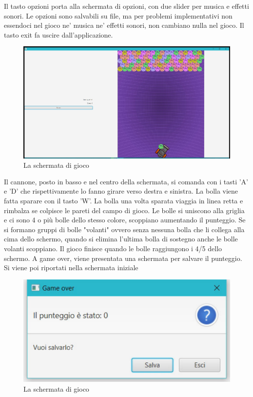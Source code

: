 \documentclass[a4paper,12pt]{report}
\begin{document}
Il tasto opzioni porta alla schermata di opzioni, con due slider per musica e effetti sonori. Le opzioni sono salvabili su file, 
ma per problemi implementativi non essendoci nel gioco ne' musica ne' effetti sonori, non cambiano nulla nel gioco.
Il tasto exit fa uscire dall'applicazione.
\begin{figure}[H]
	\centering{}
	\includegraphics[width=\textwidth]{img/game_1.pdf}
	\caption{La schermata di gioco}
\end{figure}
Il cannone, posto in basso e nel centro della schermata, si comanda con i tasti 'A' e 'D' che rispettivamente lo fanno girare verso destra e sinistra.
La bolla viene fatta sparare con il tasto 'W'. La bolla una volta sparata viaggia in linea retta e rimbalza se colpisce le pareti del campo di gioco.
Le bolle si uniscono alla griglia e ci sono 4 o più bolle dello stesso colore, scoppiano aumentando il punteggio. Se si formano gruppi di bolle "volanti" ovvero senza nessuna bolla che li collega alla cima dello schermo, quando si elimina l'ultima bolla di sostegno anche le bolle volanti scoppiano.
Il gioco finisce quando le bolle raggiungono i 4/5 dello schermo. A game over, viene presentata una schermata per salvare il punteggio.
Si viene poi riportati nella schermata iniziale
\begin{figure}[H]
	\centering{}
	\includegraphics[width=\textwidth]{img/game_over.pdf}
	\caption{La schermata di gioco}
\end{figure}
\end{document}

